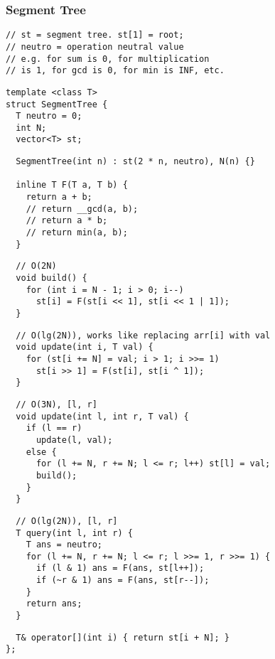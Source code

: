 \documentclass[twoside]{article}
\begin{document}
\begin{multicols*}{2}
\subsubsection*{Segment Tree}
\begin{verbatim}
// st = segment tree. st[1] = root;
// neutro = operation neutral value
// e.g. for sum is 0, for multiplication
// is 1, for gcd is 0, for min is INF, etc.
\end{verbatim}
\vspace{-12pt}
\begin{verbatim}
template <class T>
struct SegmentTree {
  T neutro = 0;
  int N;
  vector<T> st;
\end{verbatim}
\vspace{-12pt}
\begin{verbatim}
  SegmentTree(int n) : st(2 * n, neutro), N(n) {}

  inline T F(T a, T b) {
    return a + b;
    // return __gcd(a, b);
    // return a * b;
    // return min(a, b);
  }
  \end{verbatim}
\vspace{-12pt}
\begin{verbatim}
  // O(2N)
  void build() {
    for (int i = N - 1; i > 0; i--)
      st[i] = F(st[i << 1], st[i << 1 | 1]);
  }
  \end{verbatim}
\vspace{-12pt}
\begin{verbatim}
  // O(lg(2N)), works like replacing arr[i] with val
  void update(int i, T val) {
    for (st[i += N] = val; i > 1; i >>= 1)
      st[i >> 1] = F(st[i], st[i ^ 1]);
  }
\end{verbatim}
\vspace{-12pt}
\begin{verbatim}
  // O(3N), [l, r]
  void update(int l, int r, T val) {
    if (l == r)
      update(l, val);
    else {
      for (l += N, r += N; l <= r; l++) st[l] = val;
      build();
    }
  }
\end{verbatim}
\vspace{-12pt}
\begin{verbatim}
  // O(lg(2N)), [l, r]
  T query(int l, int r) {
    T ans = neutro;
    for (l += N, r += N; l <= r; l >>= 1, r >>= 1) {
      if (l & 1) ans = F(ans, st[l++]);
      if (~r & 1) ans = F(ans, st[r--]);
    }
    return ans;
  }
\end{verbatim}
\vspace{-12pt}
\begin{verbatim}
  T& operator[](int i) { return st[i + N]; }
};
\end{verbatim}


\end{multicols*}
\end{document}
